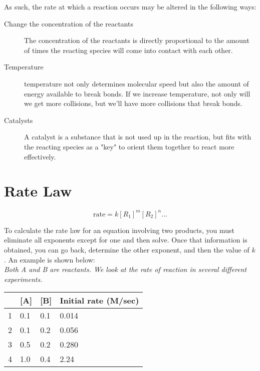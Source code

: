 As such, the rate at which a reaction occurs may be altered in the following
ways:
\begin{description}
  \item[Change the concentration of the reactants] The concentration of the
    reactants is directly proportional to the amount of times the reacting
    species will come into contact with each other.
  \item[Temperature] temperature not only determines molecular speed but also
    the amount of energy available to break bonds. If we increase temperature,
    not only will we get more collisions, but we'll have more collisions that
    break bonds.
  \item[Catalysts] A catalyst is a substance that is not used up in the
    reaction, but fits with the reacting species as a "key" to orient them
    together to react more effectively.
\end{description}

\section{Rate Law}
\begin{equation}
  \text{rate}=k[R_1]^m[R_2]^n \ldots
\end{equation}

To calculate the rate law for an equation involving two products, you must
eliminate all exponents except for one and then solve. Once that information is
obtained, you can go back, determine the other exponent, and then the value of
$k$. An example is shown below:\\

\textit{Both A and B are reactants. We look at the rate of reaction in several
different experiments.}

\begin{table}[]
\centering
\begin{tabular}{l|l|l|l|}
\cline{2-4}
                        & {[}A{]} & {[}B{]} & Initial rate (M/sec) \\ \hline
\multicolumn{1}{|l|}{1} & 0.1     & 0.1     & 0.014                \\ \hline
\multicolumn{1}{|l|}{2} & 0.1     & 0.2     & 0.056                \\ \hline
\multicolumn{1}{|l|}{3} & 0.5     & 0.2     & 0.280                \\ \hline
\multicolumn{1}{|l|}{4} & 1.0     & 0.4     & 2.24                 \\ \hline
\end{tabular}
\end{table}

